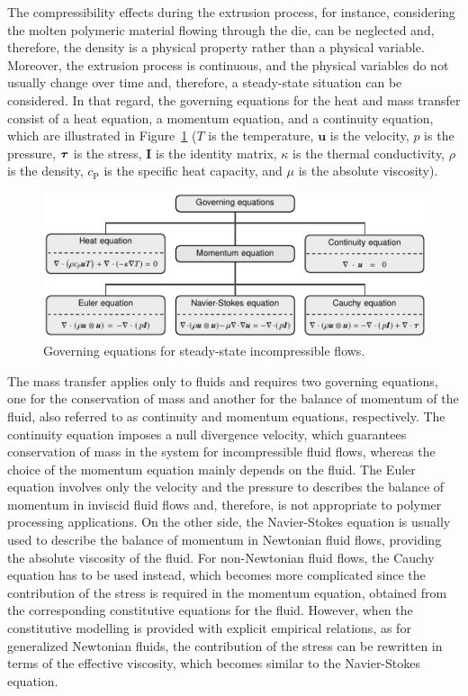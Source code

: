 The compressibility effects during the extrusion process, for instance, considering the molten polymeric material flowing through the die, can be neglected and, therefore, the density is a physical property rather than a physical variable.
Moreover, the extrusion process is continuous, and the physical variables do not usually change over time and, therefore, a steady-state situation can be considered.
In that regard, the governing equations for the heat and mass transfer consist of a heat equation, a momentum equation, and a continuity equation, which are illustrated in Figure~\ref{chap1:fig:mathematical_modelling_governing_equations} ($T$ is the temperature, $\bm{u}$ is the velocity, $p$ is the pressure, $\boldsymbol{\tau}$ is the stress, $\bm{I}$ is the identity matrix, $\kappa$ is the thermal conductivity, $\rho$ is the density, $c_{\textrm{P}}$ is the specific heat capacity, and $\mu$ is the absolute viscosity).

\begin{figure}[!htb]
\centering
\includegraphics[width=\textwidth]{chap1/include/tikz/governing_equations.pdf}
\caption{Governing equations for steady-state incompressible flows.}
\label{chap1:fig:mathematical_modelling_governing_equations}
\end{figure}

The mass transfer applies only to fluids and requires two governing equations, one for the conservation of mass and another for the balance of momentum of the fluid, also referred to as continuity and momentum equations, respectively.
The continuity equation imposes a null divergence velocity, which guarantees conservation of mass in the system for incompressible fluid flows, whereas the choice of the momentum equation mainly depends on the fluid.
The Euler equation involves only the velocity and the pressure to describes the balance of momentum in inviscid fluid flows and, therefore, is not appropriate to polymer processing applications.
On the other side, the Navier-Stokes equation is usually used to describe the balance of momentum in Newtonian fluid flows, providing the absolute viscosity of the fluid.
For non-Newtonian fluid flows, the Cauchy equation has to be used instead, which becomes more complicated since the contribution of the stress is required in the momentum equation, obtained from the corresponding constitutive equations for the fluid.
However, when the constitutive modelling is provided with explicit empirical relations, as for generalized Newtonian fluids, the contribution of the stress can be rewritten in terms of the effective viscosity, which becomes similar to the Navier-Stokes equation.

